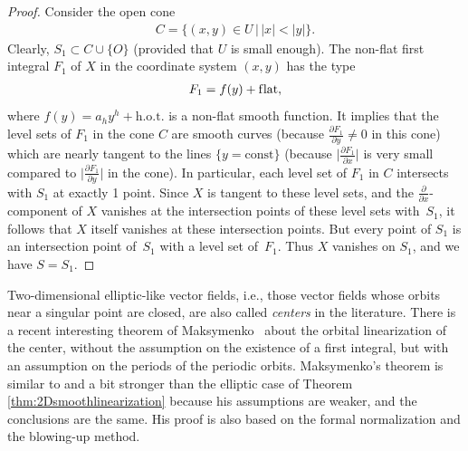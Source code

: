 \documentclass[pdftex]{sigma}
\numberwithin{equation}{section}
\begin{document}
\begin{proof}
Consider the open cone
\begin{gather*}
 C= \{(x,y) \in U \, | \, |x| < |y| \}.
\end{gather*}
Clearly, $S_1 \subset C \cup \{O\}$ (provided that $U$ is small enough). The non-f\/lat f\/irst integral $F_1$ of $X$ in the coordinate system
$(x,y)$ has the type
\begin{gather*}
F_1 = f(y) + \text{f\/lat},
\end{gather*}
where $f(y) = a_hy^h + \text{h.o.t.}$ is a non-f\/lat smooth function. It implies that the level sets of $F_1$ in the cone $C$ are smooth curves (because $\frac{\partial F_1}{\partial y} \neq 0$ in this cone) which are nearly tangent to the lines $\{y= \text{const}\}$ (because $\big|\frac{\partial F_1}{\partial x}\big|$ is very small compared to $\big|\frac{\partial F_1}{\partial y}\big| $ in the cone). In particular, each level set of $F_1$ in $C$ intersects with $S_1$ at exactly 1 point. Since $X$ is tangent to these level sets, and the $\frac{\partial}{\partial x}$-component of $X$ vanishes at the intersection points of these level sets with~$S_1$, it follows that $X$ itself vanishes at these intersection points. But every point of $S_1$ is an intersection point of~$S_1$ with a level set of~$F_1$. Thus $X$ vanishes on $S_1$, and we have $S= S_1$.
\end{proof}

\begin{Remark}
Two-dimensional elliptic-like vector f\/ields, i.e., those vector f\/ields whose orbits near a singular point are closed,
are also called \emph{centers} in the literature. There is a recent
interesting theorem of Maksymenko~\cite{Maksymenko-Symmetries2010} about the orbital linearization of the center,
without the assumption on the existence of a f\/irst integral, but with an assumption on the periods of the periodic
orbits. Maksymenko's theorem is similar to and a bit stronger than the
elliptic case of Theorem \ref{thm:2Dsmoothlinearization} because
his assumptions are weaker, and the conclusions are the same. His proof is also based on the formal normalization
and the blowing-up method.
\end{Remark}
\end{document}
